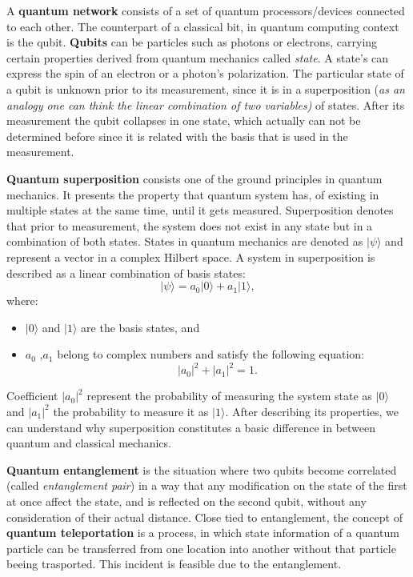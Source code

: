 \documentclass[12pt]{ieeetj}
\begin{document}
		A \textbf{quantum network} consists of a set of quantum processors/devices connected to each other.
		The counterpart of a classical bit, in quantum computing context is the qubit.
		\textbf{Qubits} can be particles such as photons
		or electrons, carrying certain properties derived from quantum mechanics called \textit{state}. A state's can express the spin of an electron or
		a photon's polarization. The particular state of a qubit is unknown prior to its measurement, since it is in a 
		superposition (\textit{as an analogy one can think the linear combination of two variables)} of states.
		After its measurement the qubit collapses in one state, which actually can not be determined
		before since it is related with the basis that is used in the measurement.
		
		\textbf{Quantum superposition} consists one of the ground principles in quantum mechanics. 
		It presents the property that quantum system has, of existing in multiple states at the same time, until it gets measured. 
		Superposition denotes that prior to measurement, the system does not exist in any state but in a combination of both states.
		States in quantum mechanics are denoted as $|\psi\rangle$ and represent a vector in a complex Hilbert space. 
		A system in superposition is described as a linear combination of basis states:
			\[
			|\psi\rangle = a_0 |0\rangle + a_1 |1\rangle,
			\]
		where:
		\begin{itemize}
			\item $|0\rangle$ and $|1\rangle$ are the basis states, and
			\item $a_0$ ,$a_1$ belong to complex numbers and satisfy the following equation:
			\[
			|a_0|^2 + |a_1|^2 = 1.
			\]
		\end{itemize}

		Coefficient $|a_0|^2$ represent the probability of measuring the system state as $|0\rangle$ and $|a_1|^2$ the probability to measure it
		as $|1\rangle$. After describing its properties, we can understand why superposition constitutes a 
		basic difference in between quantum and classical mechanics. 

		\textbf{Quantum entanglement} is the situation where two qubits become correlated
		(called \textit{entanglement pair}) in a way that
		any modification on the state of the first at once affect the state, and is reflected on the second qubit, 
		without any consideration of their actual distance. 
		Close tied to entanglement, the concept
		of \textbf{quantum teleportation} is a process, in which state information of a quantum particle can be transferred
		from one location into another without that particle beeing trasported.
		This incident is feasible due to the entanglement.
		
\end{document}
